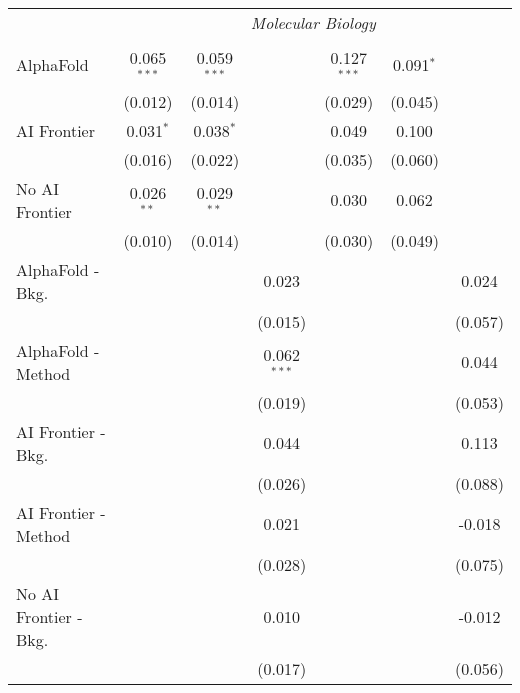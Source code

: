 \begin{tabular}{lcccccc}
 & \multicolumn{6}{c}{\textit{Molecular Biology}} \\ \\
   AlphaFold               & 0.065$^{***}$ & 0.059$^{***}$ &               & 0.127$^{***}$ & 0.091$^{*}$ &   \\   
                           & (0.012)       & (0.014)       &               & (0.029)       & (0.045)     &   \\   
   AI Frontier             & 0.031$^{*}$   & 0.038$^{*}$   &               & 0.049         & 0.100       &   \\   
                           & (0.016)       & (0.022)       &               & (0.035)       & (0.060)     &   \\   
   No AI Frontier          & 0.026$^{**}$  & 0.029$^{**}$  &               & 0.030         & 0.062       &   \\   
                           & (0.010)       & (0.014)       &               & (0.030)       & (0.049)     &   \\   
   AlphaFold - Bkg.        &               &               & 0.023         &               &             & 0.024\\   
                           &               &               & (0.015)       &               &             & (0.057)\\   
   AlphaFold - Method      &               &               & 0.062$^{***}$ &               &             & 0.044\\   
                           &               &               & (0.019)       &               &             & (0.053)\\   
   AI Frontier - Bkg.      &               &               & 0.044         &               &             & 0.113\\   
                           &               &               & (0.026)       &               &             & (0.088)\\   
   AI Frontier - Method    &               &               & 0.021         &               &             & -0.018\\   
                           &               &               & (0.028)       &               &             & (0.075)\\   
   No AI Frontier - Bkg.   &               &               & 0.010         &               &             & -0.012\\   
                           &               &               & (0.017)       &               &             & (0.056)\\   

\end{tabular}
